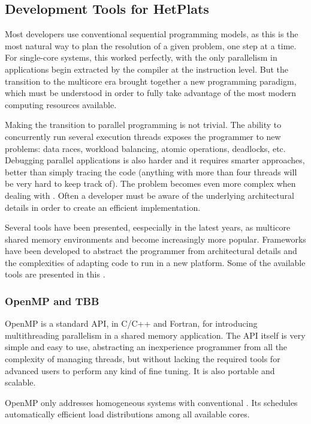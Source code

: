 \subsection{Development Tools for \aclp{HetPlat}}
\label{sec:techbg:software}
Most developers use conventional sequential programming models, as this is the most natural way to plan the resolution of a given problem, one step at a time. For single-core systems, this worked perfectly, with the only parallelism in applications begin extracted by the compiler at the instruction level. But the transition to the multicore era brought together a new programming paradigm, which must be understood in order to fully take advantage of the most modern computing resources available.

Making the transition to parallel programming is not trivial. The ability to concurrently run several execution threads exposes the programmer to new problems: data races, workload balancing, atomic operations, deadlocks, etc. Debugging parallel applications is also harder and it requires smarter approaches, better than simply tracing the code (anything with more than four threads will be very hard to keep track of). The problem becomes even more complex when dealing with \hetplats. Often a developer must be aware of the underlying architectural details in order to create an efficient implementation.

Several tools have been presented, eespecially in the latest years, as multicore shared memory environments and \hetplats become increasingly more popular. Frameworks have been developed to abstract the programmer from architectural details and the complexities of adapting code to run in a new platform. Some of the available tools are presented in this .

\subsubsection{OpenMP and \acs{TBB}}
OpenMP\cite{OpenMP:3.1} is a standard API, in C/C++ and Fortran, for introducing multithreading parallelism in a shared memory application. The API itself is very simple and easy to use, abstracting an inexperience programmer from all the complexity of managing threads, but without lacking the required tools for advanced users to perform any kind of fine tuning. It is also portable and scalable.

OpenMP only addresses homogeneous systems with conventional \cpus. Its schedules automatically efficient load distributions among all available cores.


